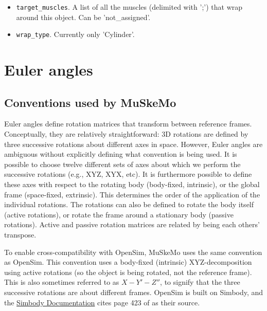 \documentclass{article}
\begin{document}
\begin{itemize}
    \item \texttt{target\_muscles}. A list of all the muscles (delimited with ';') that wrap around this object. Can be 'not\_assigned'.
    \item \texttt{wrap\_type}. Currently only 'Cylinder'.
\end{itemize}
 
\appendix
\section{Euler angles}
\label{sec:eulerangles}

\subsection{Conventions used by MuSkeMo}
Euler angles define rotation matrices that transform between reference frames. Conceptually, they are relatively straightforward: 3D rotations are defined by three successive rotations about different axes in space. However, Euler angles are ambiguous without explicitly defining what convention is being used. It is possible to choose twelve different sets of axes about which we perform the successive rotations (e.g., XYZ, XYX, etc). It is furthermore possible to define these axes with respect to the rotating body (body-fixed, intrinsic), or the global frame (space-fixed, extrinsic). This determines the order of the application of the individual rotations. The rotations can also be defined to rotate the body itself (active rotations), or rotate the frame around a stationary body (passive rotations). Active and passive rotation matrices are related by being each others' transpose.

To enable cross-compatibility with OpenSim, MuSkeMo uses the same convention as OpenSim. This convention uses a body-fixed (intrinsic) XYZ-decomposition using active rotations (so the object is being rotated, not the reference frame). This is also sometimes referred to as \(X-Y'-Z''\), to signify that the three successive rotations are about different frames. OpenSim is built on Simbody, and the \href{https://simtk.org/api_docs/molmodel/api_docs22/Simbody/html/classSimTK_1_1Rotation__.html}{Simbody Documentation} cites page 423 of \cite{kaneSpacecraftDynamics1983} as their source.
\end{document}
